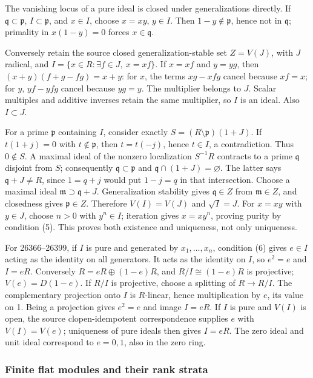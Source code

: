 The vanishing locus of a pure ideal is closed under generalizations directly. If \(\mathfrak q\subset\mathfrak p\), \(I\subset\mathfrak p\), and \(x\in I\), choose \(x=xy\), \(y\in I\). Then \(1-y\notin\mathfrak p\), hence not in \(\mathfrak q\); primality in \(x(1-y)=0\) forces \(x\in\mathfrak q\).

Conversely retain the source closed generalization-stable set \(Z=V(J)\), with \(J\) radical, and \(I=\{x\in R:\exists f\in J,\ x=xf\}\). If \(x=xf\) and \(y=yg\), then \((x+y)(f+g-fg)=x+y\): for \(x\), the terms \(xg-xfg\) cancel because \(xf=x\); for \(y\), \(yf-yfg\) cancel because \(yg=y\). The multiplier belongs to \(J\). Scalar multiples and additive inverses retain the same multiplier, so \(I\) is an ideal. Also \(I\subset J\).

For a prime \(\mathfrak p\) containing \(I\), consider exactly \(S=(R\setminus\mathfrak p)(1+J)\). If \(t(1+j)=0\) with \(t\notin\mathfrak p\), then \(t=t(-j)\), hence \(t\in I\), a contradiction. Thus \(0\notin S\). A maximal ideal of the nonzero localization \(S^{-1}R\) contracts to a prime \(\mathfrak q\) disjoint from \(S\); consequently \(\mathfrak q\subset\mathfrak p\) and \(\mathfrak q\cap(1+J)=\varnothing\). The latter says \(\mathfrak q+J\ne R\), since \(1=q+j\) would put \(1-j=q\) in that intersection. Choose a maximal ideal \(\mathfrak m\supset\mathfrak q+J\). Generalization stability gives \(\mathfrak q\in Z\) from \(\mathfrak m\in Z\), and closedness gives \(\mathfrak p\in Z\). Therefore \(V(I)=V(J)\) and \(\sqrt I=J\). For \(x=xy\) with \(y\in J\), choose \(n>0\) with \(y^n\in I\); iteration gives \(x=xy^n\), proving purity by condition (5). This proves both existence and uniqueness, not only uniqueness.

For 26366--26399, if \(I\) is pure and generated by \(x_1,\ldots,x_n\), condition (6) gives \(e\in I\) acting as the identity on all generators. It acts as the identity on \(I\), so \(e^2=e\) and \(I=eR\). Conversely \(R=eR\oplus(1-e)R\), and \(R/I\cong(1-e)R\) is projective; \(V(e)=D(1-e)\). If \(R/I\) is projective, choose a splitting of \(R\to R/I\). The complementary projection onto \(I\) is \(R\)-linear, hence multiplication by \(e\), its value on 1. Being a projection gives \(e^2=e\) and image \(I=eR\). If \(I\) is pure and \(V(I)\) is open, the source clopen-idempotent correspondence supplies \(e\) with \(V(I)=V(e)\); uniqueness of pure ideals then gives \(I=eR\). The zero ideal and unit ideal correspond to \(e=0,1\), also in the zero ring.

\subsubsection{Finite flat modules and their rank strata}\label{finite-flat-modules-and-their-rank-strata}

